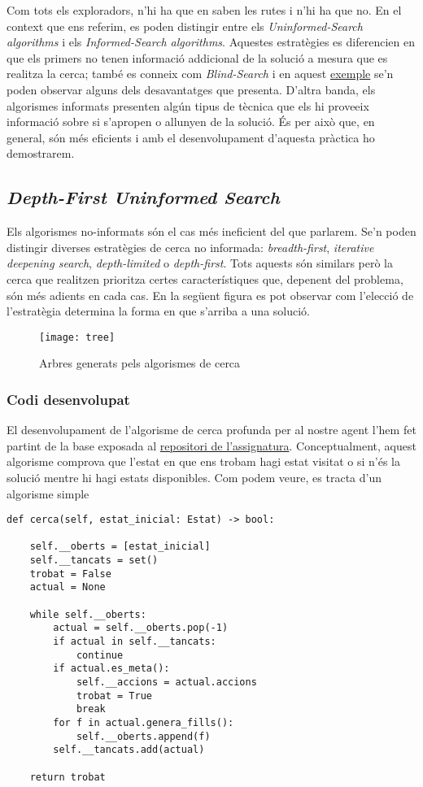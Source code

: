 \documentclass{article}
\begin{document}
Com tots els exploradors, n'hi ha que en saben les rutes i n'hi ha que no. En el context que ens referim, es poden distingir entre els \textit{Uninformed-Search algorithms} i els \textit{Informed-Search algorithms}. Aquestes estratègies es diferencien en que els primers no tenen informació addicional de la solució a mesura que es realitza la cerca; també es conneix com \textit{Blind-Search} i en aquest \href{https://www.cs.ucdavis.edu/~vemuri/classes/ecs170/blindsearches_files/blind_searches.htm}{exemple} se'n poden observar alguns dels desavantatges que presenta. D'altra banda, els algorismes informats presenten algún tipus de tècnica que els hi proveeix informació sobre si s'apropen o allunyen de la solució. És per això que, en general, són més eficients i amb el desenvolupament d'aquesta pràctica ho demostrarem.

\subsection{\textit{Depth-First Uninformed Search}}
Els algorismes no-informats són el cas més ineficient del que parlarem. Se'n poden distingir diverses estratègies de cerca no informada: \textit{breadth-first}, \textit{iterative deepening search}, \textit{depth-limited} o \textit{depth-first}. Tots aquests són similars però la cerca que realitzen prioritza certes característiques que, depenent del problema, són més adients en cada cas. En la següent figura es pot observar com l'elecció de l'estratègia determina la forma en que s'arriba a una solució. 

\begin{figure}[h]
    \centering
    \texttt{[image: tree]}
    \caption{Arbres generats pels algorismes de cerca}
    \label{fig:Tree}
\end{figure}

\subsubsection{Codi desenvolupat}
El desenvolupament de l'algorisme de cerca profunda per al nostre agent l'hem fet partint de la base exposada al \href{https://github.com/miquelmn/ia_2024/tree/master}{repositori de l'assignatura}. Conceptualment, aquest algorisme comprova que l'estat en que ens trobam hagi estat visitat o si n'és la solució mentre hi hagi estats disponibles. Com podem veure, es tracta d'un algorisme simple


\begin{verbatim}
def cerca(self, estat_inicial: Estat) -> bool:

    self.__oberts = [estat_inicial]
    self.__tancats = set()
    trobat = False
    actual = None

    while self.__oberts:
        actual = self.__oberts.pop(-1)
        if actual in self.__tancats:
            continue
        if actual.es_meta():
            self.__accions = actual.accions
            trobat = True
            break
        for f in actual.genera_fills():
            self.__oberts.append(f)
        self.__tancats.add(actual)

    return trobat
\end{verbatim}
\end{document}
